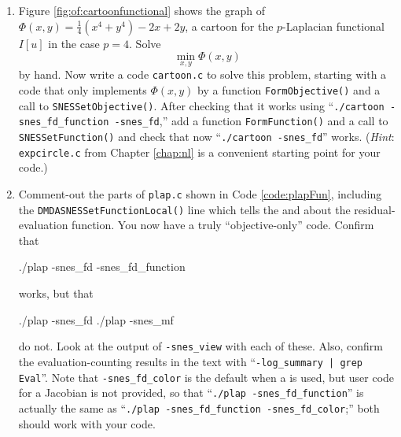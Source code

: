 \begin{enumerate}
\item Figure \ref{fig:of:cartoonfunctional} shows the graph of $\Phi(x,y)=\tfrac{1}{4}(x^4+y^4) - 2x + 2y$, a cartoon for the $p$-Laplacian functional $I[u]$ in the case $p=4$.  Solve
    $$\min_{x,y} \Phi(x,y)$$
by hand.  Now write a \PETSc code \texttt{cartoon.c} to solve this problem, starting with a code that only implements $\Phi(x,y)$ by a function \texttt{FormObjective()} and a call to \texttt{SNESSetObjective()}.  After checking that it works using ``\texttt{./cartoon -snes\_fd\_function -snes\_fd},'' add a function \texttt{FormFunction()} and a call to \texttt{SNESSetFunction()} and check that now ``\texttt{./cartoon -snes\_fd}'' works.  (\emph{Hint}:  \texttt{expcircle.c} from Chapter \ref{chap:nl} is a convenient starting point for your code.)

\item Comment-out the parts of \texttt{plap.c} shown in Code \ref{code:plapFun}, including the \texttt{DMDASNESSetFunctionLocal()} line which tells the \pDMDA and \pSNES about the residual-evaluation function.  You now have a truly ``objective-only'' code.  Confirm that
\begin{cline}
./plap -snes_fd -snes_fd_function
\end{cline}
works, but that
\begin{cline}
./plap -snes_fd
./plap -snes_mf
\end{cline}
do not.  Look at the output of \texttt{-snes\_view} with each of these.  Also, confirm the evaluation-counting results in the text with ``\texttt{-log\_summary | grep Eval}''.  Note that \texttt{-snes\_fd\_color} is the default when a \pDMDA is used, but user code for a Jacobian is not provided, so that ``\texttt{./plap -snes\_fd\_function}'' is actually the same as ``\texttt{./plap -snes\_fd\_function -snes\_fd\_color};'' both should work with your code.


\end{enumerate}

